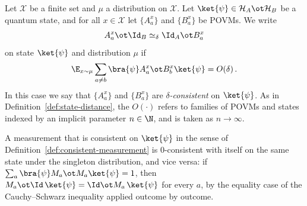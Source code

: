 \begin{definition}\label{def:consistency}
	\leanok
	Let $\mathcal X$ be a finite set and $\mu$ a distribution on $\mathcal X$. Let $\ket{\psi} \in \mathcal H_A \ot \mathcal H_B$ be a quantum state, and for all $x \in \mathcal X$ let $\{A^x_a\}$ and $\{B^x_a\}$ be POVMs. We write
	\[
		A^x_a \ot \Id_B \simeq_\delta \Id_A \ot B^x_a
	\]
	on state $\ket{\psi}$ and distribution $\mu$ if
	\[
		\E_{x \sim \mu} \sum_{a \ne b} \bra{\psi} A^x_a \ot B^x_b \ket{\psi} = O(\delta)\,.
	\]
	In this case we say that $\{A^x_a\}$ and $\{B^x_a\}$ are \emph{$\delta$-consistent} on $\ket{\psi}$. As in Definition~\ref{def:state-distance}, the $O(\cdot)$ refers to families of POVMs and states indexed by an implicit parameter $n \in \N$, and is taken as $n \to \infty$.
\end{definition}

A measurement that is consistent on $\ket{\psi}$ in the sense of Definition~\ref{def:consistent-measurement} is $0$-consistent with itself on the same state under the singleton distribution, and vice versa: if $\sum_a \bra{\psi} M_a \ot M_a \ket{\psi} = 1$, then $M_a \ot \Id\, \ket{\psi} = \Id \ot M_a\, \ket{\psi}$ for every $a$, by the equality case of the Cauchy--Schwarz inequality applied outcome by outcome.

